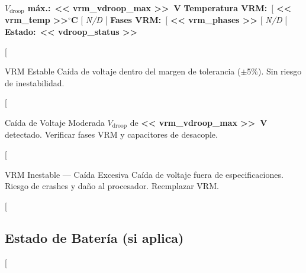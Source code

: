 \documentclass[11pt, a4paper, final]{article}
\newcommand{\mv}[1]{\textcolor{AMPrimary}{\textbf{#1}}}
\begin{document}

\vspace{0.3cm}
\noindent\small
\textbf{$V_{\text{droop}}$ máx.:}\ \mv{<< vrm_vdroop_max >>\ V}\quad
\textbf{Temperatura VRM:}\
[%
  \mv{<< vrm_temp >>$^\circ$C}%
[%
  \textcolor{AMSlate}{\textit{N/D}}%
[%
\textbf{Fases VRM:}\
[%
  \mv{<< vrm_phases >>}%
[%
  \textcolor{AMSlate}{\textit{N/D}}%
[%
\textbf{Estado:}\ \mv{<< vdroop_status >>}

\vspace{0.3cm}
[%
\begin{amboxok}{VRM Estable}
  \scriptsize Caída de voltaje dentro del margen de tolerancia ($\pm$5\%). Sin riesgo de inestabilidad.
\end{amboxok}
[%
\begin{amboxwarn}{Caída de Voltaje Moderada}
  \scriptsize $V_{\text{droop}}$ de \mv{<< vrm_vdroop_max >>\ V} detectado. Verificar fases VRM y capacitores de desacople.
\end{amboxwarn}
[%
\begin{amboxcrit}{VRM Inestable --- Caída Excesiva}
  \scriptsize Caída de voltaje fuera de especificaciones. Riesgo de crashes y daño al procesador. Reemplazar VRM.
\end{amboxcrit}
[%

\vspace{0.6cm}


\subsection{Estado de Batería (si aplica)}

[%
\end{document}
